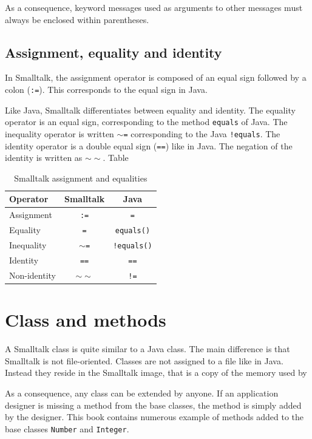 \documentclass[twoside]{book}
\begin{document}
As a consequence, keyword messages used as arguments to other
messages must always be enclosed within parentheses.

\subsection{ Assignment, equality and identity}
In Smalltalk, the assignment operator is composed of an equal sign
followed by a colon ({\tt :=}). This corresponds to the equal sign
in Java.

Like Java, Smalltalk differentiates between equality and identity.
The equality operator is an equal sign, corresponding to the
method {\tt equals} of Java. The inequality operator is written
{\tt $\sim$=} corresponding to the Java {\tt !equals}. The
identity operator is a double equal sign ({\tt ==}) like in Java.
The negation of the identity is written as {\tt $\sim\sim$}. Table
\begin{table}[h]
  \centering
  \caption{Smalltalk assignment and equalities}\label{tb:stEqualities}
\vspace{1 ex}
\begin{tabular}{|l|c|c|} \hline
  Operator & Smalltalk & Java \\  \hline
  Assignment & {\tt :=} & {\tt =} \\
  Equality & {\tt =} & {\tt equals()} \\
  Inequality & {\tt $\sim$=} & {\tt !equals()} \\
  Identity & {\tt ==} & {\tt ==} \\
  Non-identity & {\tt $\sim\sim$} & {\tt !=} \\ \hline
\end{tabular}
\end{table}

\section{Class and methods}
A Smalltalk class is quite similar to a Java class. The main
difference is that Smalltalk is not file-oriented. Classes are not
assigned to a file like in Java. Instead they reside in the
Smalltalk image, that is a copy of the memory used by

As a consequence, any class can be extended by anyone. If an
application designer is missing a method from the base classes,
the method is simply added by the designer. This book contains
numerous example of methods added to the base classes {\tt Number}
and {\tt Integer}.
\end{document}
